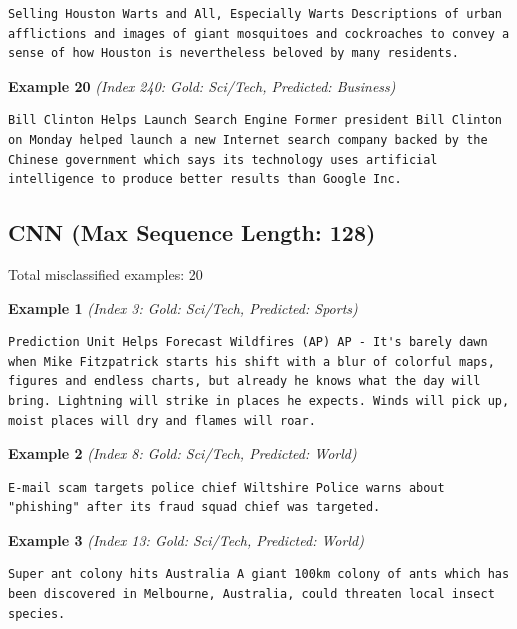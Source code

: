 \begin{Verbatim}[breaklines=true,breakanywhere=true,fontsize=\small]
Selling Houston Warts and All, Especially Warts Descriptions of urban afflictions and images of giant mosquitoes and cockroaches to convey a sense of how Houston is nevertheless beloved by many residents.
\end{Verbatim}

\noindent
\textbf{Example 20} \quad \textit{(Index 240: Gold: Sci/Tech, Predicted: Business)}

\begin{Verbatim}[breaklines=true,breakanywhere=true,fontsize=\small]
Bill Clinton Helps Launch Search Engine Former president Bill Clinton on Monday helped launch a new Internet search company backed by the Chinese government which says its technology uses artificial intelligence to produce better results than Google Inc.
\end{Verbatim}

\subsection{CNN (Max Sequence Length: 128)}
\label{app:run2}

Total misclassified examples: 20

\noindent
\textbf{Example 1} \quad \textit{(Index 3: Gold: Sci/Tech, Predicted: Sports)}

\begin{Verbatim}[breaklines=true,breakanywhere=true,fontsize=\small]
Prediction Unit Helps Forecast Wildfires (AP) AP - It's barely dawn when Mike Fitzpatrick starts his shift with a blur of colorful maps, figures and endless charts, but already he knows what the day will bring. Lightning will strike in places he expects. Winds will pick up, moist places will dry and flames will roar.
\end{Verbatim}

\noindent
\textbf{Example 2} \quad \textit{(Index 8: Gold: Sci/Tech, Predicted: World)}

\begin{Verbatim}[breaklines=true,breakanywhere=true,fontsize=\small]
E-mail scam targets police chief Wiltshire Police warns about "phishing" after its fraud squad chief was targeted.
\end{Verbatim}

\noindent
\textbf{Example 3} \quad \textit{(Index 13: Gold: Sci/Tech, Predicted: World)}

\begin{Verbatim}[breaklines=true,breakanywhere=true,fontsize=\small]
Super ant colony hits Australia A giant 100km colony of ants which has been discovered in Melbourne, Australia, could threaten local insect species.
\end{Verbatim}

